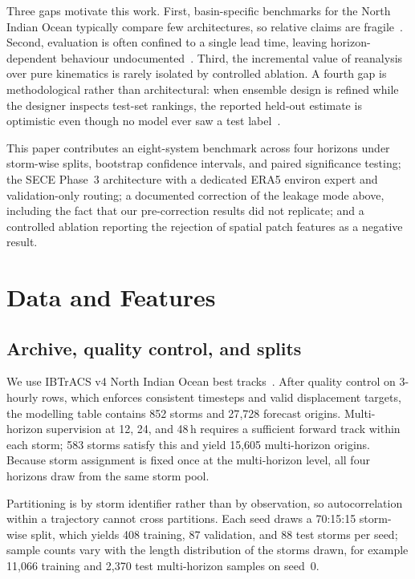 \documentclass[conference]{IEEEtran}
\newcommand{\sece}{SECE}
\newcommand{\era}{ERA5}
\newcommand{\ibtracs}{IBTrACS}
\begin{document}
Three gaps motivate this work. First, basin-specific benchmarks for the North
Indian Ocean typically compare few architectures, so relative claims are
fragile~\cite{kar2021tropical,hossain2021track}. Second, evaluation is often
confined to a single lead time, leaving horizon-dependent behaviour
undocumented~\cite{kumar2024machine}. Third, the incremental value of reanalysis
over pure kinematics is rarely isolated by controlled ablation. A fourth gap is
methodological rather than architectural: when ensemble design is refined while
the designer inspects test-set rankings, the reported held-out estimate is
optimistic even though no model ever saw a test
label~\cite{cawley2010}.

This paper contributes an eight-system benchmark across four horizons under
storm-wise splits, bootstrap confidence intervals, and paired significance
testing; the \sece{} Phase~3 architecture with a dedicated \era{} environ expert
and validation-only routing; a documented correction of the leakage mode above,
including the fact that our pre-correction results did not replicate; and a
controlled ablation reporting the rejection of spatial patch features as a
negative result.

\section{Data and Features}
\subsection{Archive, quality control, and splits}
We use \ibtracs{} v4 North Indian Ocean best
tracks~\cite{knapp2010ibtracs,gahtan2024ibtracs}. After quality control on
3-hourly rows, which enforces consistent timesteps and valid displacement
targets, the modelling table contains 852 storms and 27{,}728 forecast origins.
Multi-horizon supervision at 12, 24, and 48\,h requires a sufficient forward
track within each storm; 583 storms satisfy this and yield 15{,}605 multi-horizon
origins. Because storm assignment is fixed once at the multi-horizon level, all
four horizons draw from the same storm pool.

Partitioning is by storm identifier rather than by observation, so
autocorrelation within a trajectory cannot cross partitions. Each seed draws a
70:15:15 storm-wise split, which yields 408 training, 87 validation, and 88 test
storms per seed; sample counts vary with the length distribution of the storms
drawn, for example 11{,}066 training and 2{,}370 test multi-horizon samples on
seed~0.
\end{document}
